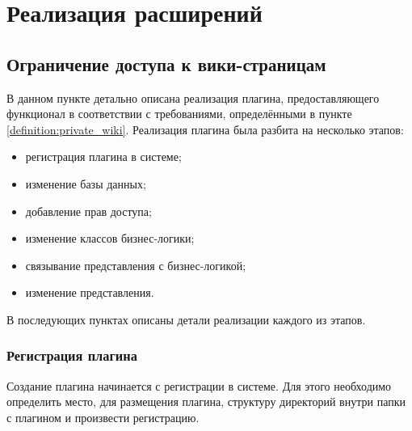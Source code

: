 \lstset{language=Ruby}

\chapter{Реализация расширений}
\label{section:implementation}

\section{Ограничение доступа к вики-страницам}
\label{section:private_wiki}
В данном пункте детально описана реализация плагина, предоставляющего
функционал в соответствии с требованиями, определёнными в пункте
\ref{definition:private_wiki}. Реализация плагина была разбита на несколько
этапов:
\begin{itemize}
  \item регистрация плагина в системе;
  \item изменение базы данных;
  \item добавление прав доступа;
  \item изменение классов бизнес-логики;
  \item связывание представления с бизнес-логикой;
  \item изменение представления.
\end{itemize}
В последующих пунктах описаны детали реализации каждого из этапов.

\subsection{Регистрация плагина}
Создание плагина начинается с регистрации в системе. Для этого необходимо
определить место, для размещения плагина, структуру директорий
внутри папки с плагином и произвести регистрацию.

